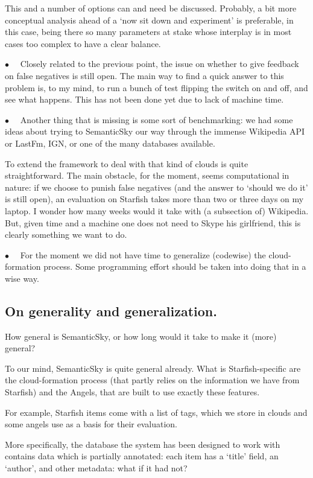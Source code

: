 \documentclass[11pt]{article}
\begin{document}
This and a number of options can and need be discussed. Probably, a bit more conceptual analysis ahead of a `now sit down and experiment' is preferable, in this case, being there so many parameters at stake whose interplay is in most cases too complex to have a clear balance.

$\bullet \quad$ Closely related to the previous point, the issue on whether to give feedback on false negatives is still open. The main way to find a quick answer to this problem is, to my mind, to run a bunch of test flipping the switch on and off, and see what happens. This has not been done yet due to lack of machine time.

$\bullet \quad$ Another thing that is missing is some sort of benchmarking: we had some ideas about trying to SemanticSky our way through the immense Wikipedia API or LastFm, IGN, or one of the many databases available.

To extend the framework to deal with that kind of clouds is quite straightforward. The main obstacle, for the moment, seems computational in nature: if we choose to punish false negatives (and the answer to `should we do it' is still open), an evaluation on Starfish takes more than two or three days on my laptop. I wonder how many weeks would it take with (a subsection of) Wikipedia. But, given time and a machine one does not need to Skype his girlfriend, this is clearly something we want to do.

$\bullet \quad$ For the moment we did not have time to generalize (codewise) the cloud-formation process. Some programming effort should be taken into doing that in a wise way.

\subsection{On generality and generalization.}

How general is SemanticSky, or how long would it take to make it (more) general?

To our mind, SemanticSky is quite general already. What is Starfish-specific are the cloud-formation process (that partly relies on the information we have from Starfish) and the Angels, that are built to use exactly these features.

For example, Starfish items come with a list of tags, which we store in clouds and some angels use as a basis for their evaluation.

More specifically, the database the system has been designed to work with contains data which is partially annotated: each item has a `title' field, an `author', and other metadata: what if it had not?
\end{document}

